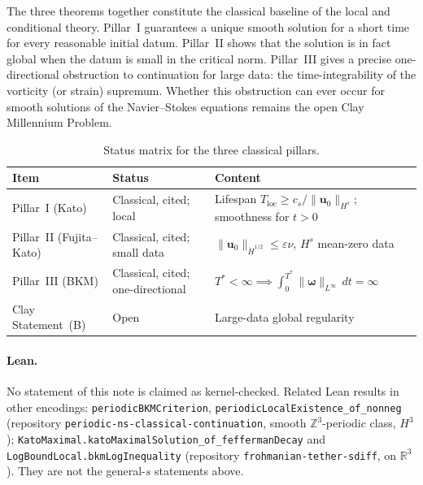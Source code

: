 \documentclass[11pt,a4paper]{article}
\begin{document}
The three theorems together constitute the classical baseline of the local and conditional theory. Pillar~I guarantees a unique smooth solution for a short time for every reasonable initial datum. Pillar~II shows that the solution is in fact global when the datum is small in the critical norm. Pillar~III gives a precise one-directional obstruction to continuation for large data: the time-integrability of the vorticity (or strain) supremum. Whether this obstruction can ever occur for smooth solutions of the Navier--Stokes equations remains the open Clay Millennium Problem.

\begin{table}[htbp]
\centering
\caption{Status matrix for the three classical pillars.}
\label{tab:status}
\begin{tabular}{@{}llp{6.8cm}@{}}
\toprule
\textbf{Item} & \textbf{Status} & \textbf{Content} \\
\midrule
Pillar~I (Kato) & Classical, cited; local & Lifespan \(T_{\mathrm{loc}}\ge c_s/\|\mathbf{u}_0\|_{H^s}\); smoothness for \(t>0\) \\
Pillar~II (Fujita--Kato) & Classical, cited; small data & \(\|\mathbf{u}_0\|_{\dot{H}^{1/2}}\le\varepsilon\nu\), \(H^s\) mean-zero data \\
Pillar~III (BKM) & Classical, cited; one-directional & \(T^*<\infty\implies\int_0^{T^*}\|\boldsymbol{\omega}\|_{L^\infty}\,dt=\infty\) \\
Clay Statement~(B) & Open & Large-data global regularity \\
\bottomrule
\end{tabular}
\end{table}

\paragraph{Lean.} No statement of this note is claimed as kernel-checked. Related Lean results in other encodings: \texttt{periodicBKMCriterion}, \texttt{periodicLocalExistence\_of\_nonneg} (repository \texttt{periodic-ns-classical-continuation}, smooth \(\mathbb{Z}^3\)-periodic class, \(H^3\)); \texttt{KatoMaximal.katoMaximalSolution\_of\_feffermanDecay} and \texttt{LogBoundLocal.bkmLogInequality} (repository \texttt{frohmanian-tether-sdiff}, on \(\mathbb{R}^3\)). They are not the general-\(s\) statements above.
\end{document}
